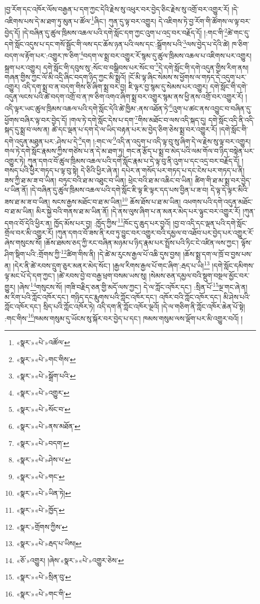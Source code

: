 །བྱ་རོག་དང་འཁོར་ལོས་བརྒྱན་པ་དག་ཀྱང་དེའི་རྗེས་སུ་འཕུར་བར་བྱེད་ཅིང་རྗེས་སུ་འགྲོ་བར་འགྱུར་རོ། །དེ་འཇིགས་པས་དེ་མ་ཐག་ཏུ་མུན་པ་ཚོལ་\footnote{«སྣར་»«པེ་»འཚོལ་}ཞིང་། ཀུན་དུ་ལྟ་བར་འགྱུར། དེ་འཇིགས་ཏེ་བྱ་རོག་གི་ཚོགས་ལ་ལྟ་བར་བྱེད་དོ། །དེ་བཞིན་དུ་ཚུལ་ཁྲིམས་འཆལ་པའི་དགེ་སློང་དག་ཀྱང་འུག་པ་འདྲ་བར་བརྗོད་དོ། །:གང་གི་\footnote{«སྣར་»«པེ་»གང་གིས་}ཚེ་གང་དུ་དགེ་སློང་འདུས་པ་དང་གསོ་སྦྱོང་གི་ལས་དང་ཆོས་ཉན་པའི་ལས་དང་:སྒྲོགས་པའི་\footnote{«སྣར་»«པེ་»སྒྲོག་པའི་}ལས་བྱེད་པ་དེའི་ཚེ། ཁ་ཅིག་བདག་ལ་རྟོག་པར་:འགྱུར་ཁ་ཅིག་\footnote{«སྣར་»«པེ་»འགྱུར་}བདག་ལ་སྨྲ་བར་འགྱུར་རོ་སྙམ་དུ་ཚུལ་ཁྲིམས་འཆལ་པ་འཇིགས་པར་འགྱུར། སྐྲག་པར་འགྱུར། དགེ་སློང་གི་དབུས་སུ་:སོང་བ་བསྒྲིབས་པར་སོང་བ་\footnote{«སྣར་»«པེ་»སོང་བ་}དེ་དགེ་སློང་གི་དགེ་འདུན་གྱིས་རིག་ནས། གཞན་གྱིས་ཀྱང་ལོ་མི་འདྲི་ཞིང་བདག་ཉིད་ཀྱང་མི་སྨྲའོ། །ངོ་མི་ལྟ་ཞིང་སེམས་ས་ཕྱོགས་ལ་གཏད་དེ་འདུག་པར་འགྱུར། འདི་དག་སྨྲ་བ་ན་བདག་གིས་ཅི་ཞིག་སྨྲ་བར་བྱ། ཇི་ལྟར་བྱ་སྙམ་དུ་སེམས་པར་འགྱུར། དགེ་སློང་གི་དགེ་འདུན་ལངས་པའི་ཚེ་བདག་འགྲོ་བ་ན་ཁ་ཅིག་འགའ་ཞིག་སྨྲ་བར་འགྱུར་སྙམ་ནས་ཕྱི་ནས་འགྲོ་བར་འགྱུར་རོ། །འདི་ལྟར་ཡང་ཚུལ་ཁྲིམས་འཆལ་པའི་དགེ་སློང་དེའི་ཚེ་ཁྱིམ་:ནས་འཐོན་ཏེ་\footnote{«སྣར་»«པེ་»ནས་མཐོན་}འུག་པ་ཚང་ནས་འབྱུང་བ་བཞིན་དུ་ཕྱོགས་བཞིར་ལྟ་བར་བྱེད་དོ། །གལ་ཏེ་དགེ་སློང་དེས་པ་དག་\footnote{«སྣར་»«པེ་»བདག་}གིས་མཐོང་བ་ལས་འདི་སྐད་དུ། དགེ་སློང་འདི་ནི་འདི་སྐད་དུ་སྨྲ་བ་ལས་ན། ཚེ་དང་ལྡན་པ་དག་དེ་ལ་ཡིད་བརྟན་པར་མ་བྱེད་ཅིག་ཅེས་སྨྲ་བར་འགྱུར་རོ། །དགེ་སློང་གི་དགེ་འདུན་མཐུན་པར་:ཤེས་པ་དེ་\footnote{«སྣར་»«པེ་»ཤེས་པ་}དག །:གང་ལ་\footnote{«སྣར་»«པེ་»གང་}འདི་ན་འདུག་པ་འདི་ལྟ་བུ་སུ་ཞིག་དེ་ལ་རྗེས་སུ་ལྟ་བར་འགྱུར། གལ་ཏེ་དགེ་སློང་རྣམས་ཀྱིས་གཙེས་པ་ན་དེ་མ་ཐག་ཏུ། གང་ན་རྩོད་པ་སྨྲ་བ་མེད་པའི་ལམ་གོལ་བ་ཉིད་བསྟེན་པར་འགྱུར་ཏེ། ཀུན་དགའ་བོ་ཚུལ་ཁྲིམས་འཆལ་པའི་དགེ་སློང་རྣམ་པ་དེ་ལྟ་བུ་ནི་འུག་པ་དང་འདྲ་བར་བརྗོད་དོ། །གསད་པའི་ཕྱིར་གཏད་པ་ལྟ་བུ་སྟེ། དེ་ཅིའི་ཕྱིར་ཞེ་ན། དཔེར་ན་གསོད་པར་གཏད་པ་དང་ངེས་པར་གཏད་པ་ནི། ཟས་ཀྱི་ཐ་མ་ཟ་བ་ཡིན། བཏུང་བའི་ཐ་མ་འཐུང་བ་ཡིན། ཕྲེང་བའི་ཐ་མ་འཆིང་བ་ཡིན། ཚིག་གི་ཐ་མ་སྨྲ་བར་བྱེད་པ་ཡིན་ནོ། །དེ་བཞིན་དུ་ཚུལ་ཁྲིམས་འཆལ་པའི་དགེ་སློང་ཇི་ལྟ་ཇི་ལྟར་དད་པས་བྱིན་པ་ཟ་བ། དེ་ལྟ་དེ་ལྟར་མིའི་ཟས་ཐ་མ་ཟ་བ་ཡིན། སངས་རྒྱས་མཐོང་བ་ཐ་མ་ཡིན།\footnote{«སྣར་»«པེ་»ཡིན་ཏེ།} ཆོས་ཐོས་པ་ཐ་མ་ཡིན། འཕགས་པའི་དགེ་འདུན་མཐོང་བ་ཐ་མ་ཡིན། མིར་སྐྱེ་བའི་གནས་ཐ་མ་ཡིན་ནོ། །དེ་ནས་ལུས་ཞིག་པ་ན་མནར་མེད་པར་ལྟུང་བར་འགྱུར་རོ། །ཀུན་དགའ་བོ་དེའི་ཕྱིར་ན། ཁྱོད་མོས་པར་བྱ། :ཁྱོད་ཀྱིས་\footnote{«སྣར་»«པེ་»ཁྱོད་}ཁོང་དུ་ཆུད་པར་བྱའོ། །བྱ་བ་འདི་དང་ལྡན་པའི་དགེ་སློང་གྲོལ་བར་མི་འགྱུར་རོ། །ཀུན་དགའ་བོ་ཟས་ནི་རབ་ཏུ་བྱུང་བར་འགྱུར་བའི་དམྱལ་བ་འཐོབ་པར་བྱེད་པར་འགྱུར་རོ་ཞེས་གསུངས་སོ། །ཆོས་ཐམས་ཅད་ཀྱི་རང་བཞིན་མཉམ་པ་ཉིད་རྣམ་པར་སྤྲོས་པའི་ཏིང་ངེ་འཛིན་ལས་ཀྱང་། ལྟོས་ཤིག་སྡིག་པའི་:གྲོགས་ཀྱི་\footnote{«སྣར་»གྲོགས་ཀྱིས་}ཚིག་གིས་ནི། །དེ་ཚེ་མ་རུངས་རྒྱལ་པོ་འཆི་དུས་བྱས། །ཆོས་སྨྲ་དག་ལ་ཁྲོ་བ་བྱས་པས་ན། །དེར་ནི་ཚེ་རབས་དྲུག་ཅུར་མནར་མེད་སོང་། །རྒྱལ་རིགས་རྒྱལ་པོ་གང་ཞིག་:རྦད་པ་ཡི།\footnote{«སྣར་»«པེ་»རྦད་པ་ཡིས།} །དགེ་སློང་དམིགས་ལྟ་མང་པོ་དེ་དག་ཀྱང་། །ཚེ་རབས་བྱེ་བ་བརྒྱ་ཕྲག་བསམ་ཡས་སུ། །སེམས་ཅན་དམྱལ་བའི་སྡུག་བསྔལ་མྱོང་བར་གྱུར། །ཞེས་\footnote{«ཅོ་»འགྱུར། །ཞེས་«སྣར་»«པེ་»འགྱུར་ཅེས་}གསུངས་སོ། །གཟི་བརྗིད་ཅན་གྱི་མདོ་ལས་ཀྱང་། དེ་ལ་ཀློང་འཁོར་དང་། :སྲིན་པོ་\footnote{«སྣར་»«པེ་»སྲིན་བུ་}ལྔ་གང་ཞེ་ན། མ་རིག་པའི་ཀློང་འཁོར་དང་། གཉིད་དང་རྨུགས་པའི་ཀློང་འཁོར་དང་། འཁོར་བའི་ཀློང་འཁོར་དང་། མི་ཤེས་པའི་ཀློང་འཁོར་དང་། སྲིད་པའི་ཀློང་འཁོར་ཏེ། འདི་དག་ནི་ཀློང་འཁོར་ལྔའོ། །དེ་ལ་གཅིག་ནི་ཀློང་འཁོར་ཆེན་པོ་སྟེ། :གང་གིས་\footnote{«སྣར་»«པེ་»གང་གི་}ཁམས་གསུམ་དུ་ཡོངས་སུ་སྐོར་བར་བྱེད་པ་དང་། ཁམས་གསུམ་ལས་ལྡོག་པར་མི་འགྱུར་བའོ། །
